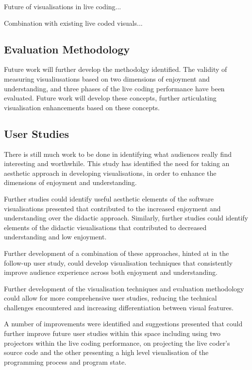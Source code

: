 Future of visualisations in live coding...

Combination with existing live coded visuals...

\subsection{Evaluation Methodology}

Future work will further develop the methodolgy identified. The validity of measuring visualiusations based on two dimensions of enjoyment and understanding, and three phases of the live coding performance have been evaluated. Future work will develop these concepts, further articulating visualisation enhancements based on these concepts. 

\subsection{User Studies}

There is still much work to be done in identifying what audiences really find interesting and worthwhile. This study has identified the need for taking an aesthetic approach in developing visualisations, in order to enhance the dimensions of enjoyment and understanding. 

Further studies could identify useful aesthetic elements of the software visualisations presented that contributed to the increased enjoyment and understanding over the didactic approach. Similarly, further studies could identify elements of the didactic visualisations that contributed to decreased understanding and low enjoyment.

Further development of a combination of these approaches, hinted at in the follow-up user study, could develop visualisation techniques that consistently improve audience experience across both enjoyment and understanding.

Further development of the visualisation techniques and evaluation methodology could allow for more comprehensive user studies, reducing the technical challenges encountered and increasing differentiation between visual features.

A number of improvements were identified and suggestions presented that could further improve future user studies within this space including using two projectors within the live coding performance, on projecting the live coder's source code and the other presenting a high level visualisation of the programming process and program state.

